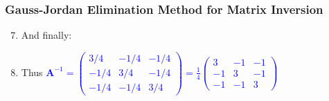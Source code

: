 \documentclass[10pt,compress]{beamer}
\begin{document}
\begin{frame}
\begin{enumerate}
  \end{enumerate}
\end{frame}


\begin{frame}
  \frametitle{Gauss-Jordan Elimination Method for Matrix Inversion} 
  \begin{enumerate}
  \setcounter{enumi}{6}
     \item <1-> And finally: 
     \item <2-> Thus \textcolor{blue}{$\bm{A}^{-1} = \begin{pmatrix} 3/4 & -1/4 & -1/4 \\ -1/4 & 3/4 & -1/4 \\ -1/4 & -1/4 & 3/4 \end{pmatrix} = \displaystyle\frac{1}{4} \begin{pmatrix} 3 & -1 & -1 \\ -1 & 3 & -1 \\ -1 & -1 & 3 \end{pmatrix}$}
  \end{enumerate}
\end{frame}
\end{document}
